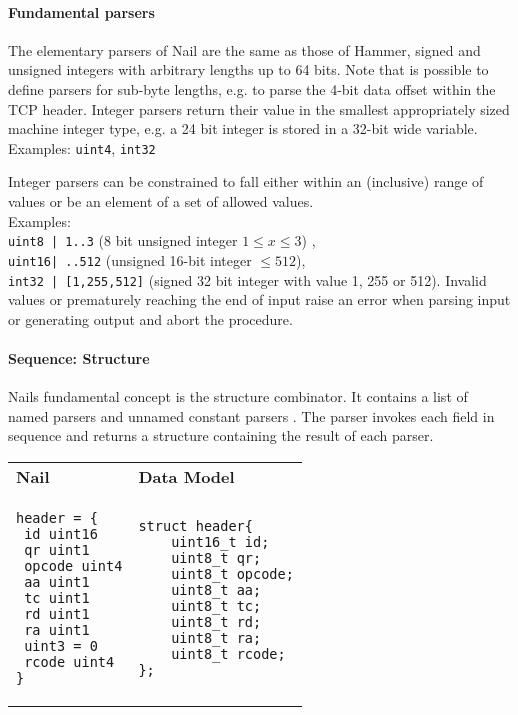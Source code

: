 \paragraph{Fundamental parsers}
The elementary parsers of Nail are the same as those of Hammer, signed and
unsigned integers with arbitrary lengths up to 64 bits. Note that is possible to
define parsers for sub-byte lengths, e.g. to parse the 4-bit data offset within
the TCP header. Integer parsers return their value in the
smallest appropriately sized machine integer type, e.g. a 24 bit integer is stored in a 32-bit wide variable.\\
Examples: \texttt{uint4}, \texttt{int32}

Integer parsers can be constrained to fall either within an (inclusive) range of
values or be an
element of a set of allowed values. \\
Examples:\\
\texttt{uint8 | 1..3} (8 bit unsigned integer $1\leq x \leq 3$) ,\\
\texttt{uint16| ..512} (unsigned 16-bit integer $\leq 512$),\\
\texttt{int32 | [1,255,512]} (signed 32 bit integer with value 1, 255 or 512).
Invalid values or prematurely reaching the end of input raise an error when
parsing input or generating output and abort the procedure.


\paragraph{Sequence: Structure}
Nails fundamental concept is the structure combinator. It contains a list of
named parsers and unnamed constant parsers  . The parser invokes each field 
in sequence and returns a structure containing the result of each parser.

\begin{tabular}{ll}
  \textbf{Nail} & \textbf{Data Model}\\
  \begin{minipage}{1.2in}
\begin{verbatim}
header = {
 id uint16
 qr uint1
 opcode uint4
 aa uint1 
 tc uint1
 rd uint1
 ra uint1
 uint3 = 0
 rcode uint4
}
\end{verbatim} 
  \end{minipage}
  & 
  \begin{minipage}{1.2in}
\begin{verbatim}
struct header{
    uint16_t id;
    uint8_t qr;
    uint8_t opcode;
    uint8_t aa;
    uint8_t tc;
    uint8_t rd;
    uint8_t ra;
    uint8_t rcode;
};
\end{verbatim} 
  \end{minipage}
  \\
\end{tabular}
